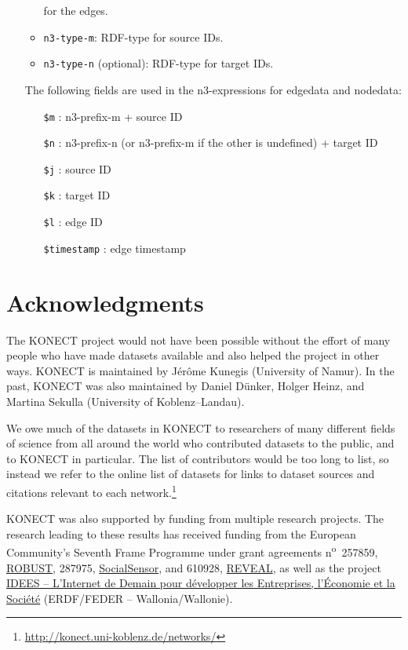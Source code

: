 \documentclass{article}
\begin{document}
\begin{itemize}
\begin{itemize}
    for the edges.
  \item \texttt{n3-type-m}: RDF-type for source
    IDs.
  \item \texttt{n3-type-n} (optional): RDF-type
    for target IDs.
  \end{itemize}
  The following fields are used in the n3-expressions for
  edgedata and nodedata:
  \begin{itemize}
  \item[\texttt{\$m}]: n3-prefix-m + source ID
  \item[\texttt{\$n}]: n3-prefix-n (or n3-prefix-m
    if the other is undefined) + target ID
  \item[\texttt{\$j}]: source ID
  \item[\texttt{\$k}]: target ID
  \item[\texttt{\$l}]: edge ID
  \item[\texttt{\$timestamp}]: edge timestamp
  \end{itemize}
\end{itemize}

\section*{Acknowledgments}
The KONECT project would not have been possible without the
effort of many people who have made datasets available and also helped
the project in other ways.   
KONECT is maintained by Jérôme Kunegis (University of Namur). 
In the past, KONECT was also maintained by Daniel Dünker, Holger Heinz,
and Martina Sekulla (University of Koblenz--Landau). 

We owe much of the datasets in KONECT to researchers of many different
fields of science from all around the world who contributed datasets to
the public, and to KONECT in particular.  The list of contributors would
be too long to list, so instead we refer to the online list of datasets
for links to dataset sources and citations relevant to each
network.\footnote{\url{http://konect.uni-koblenz.de/networks/}}

KONECT was also supported by funding from multiple research projects. 
The research leading to
these results has received funding from the European Community's Seventh
Frame Programme under grant agreements n\textsuperscript{o}~257859,
\href{http://robust-project.eu/}{ROBUST}, 287975,
\href{http://www.socialsensor.eu/}{SocialSensor}, and 610928,
\href{http://revealproject.eu/}{REVEAL}, as well as the project
\href{http://nouvelles.unamur.be/upnews.2015-10-01.8995593781}{IDEES --
  L'Internet de Demain pour développer les Entreprises, l'Économie et la
  Société} (ERDF/FEDER -- Wallonia/Wallonie). 
\end{document}
